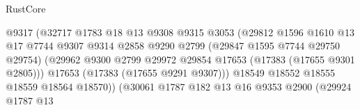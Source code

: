 \begin{lexlean}{RustCore}
\begin{coremodule}
                                                @9317
                                                (@32717
                                                  @1783
                                                  @18
                                                  @13
                                                  @9308
                                                  @9315
                                                  @3053
                                                  (@29812
                                                    @1596
                                                    @1610
                                                    @13
                                                    @17
                                                    @7744
                                                    @9307
                                                    @9314
                                                    @2858
                                                    @9290
                                                    @2799
                                                    (@29847 @1595 @7744 @29750 @29754)
                                                    (@29962
                                                      @9300
                                                      @2799
                                                      @29972
                                                      @29854
                                                      @17653
                                                      (@17383 (@17655 @9301 @2805)))
                                                    @17653
                                                    (@17383 (@17655 @9291 @9307)))
                                                  @18549
                                                  @18552
                                                  @18555
                                                  @18559
                                                  @18564
                                                  @18570))
                                              (@30061
                                                @1787
                                                @182
                                                @13
                                                @16
                                                @9353
                                                @2900
                                                (@29924
                                                  @1787
                                                  @13

\end{coremodule}
\end{lexlean}
